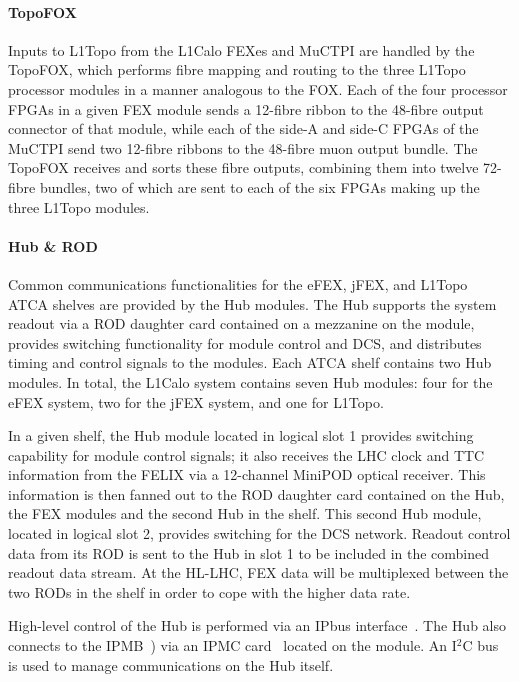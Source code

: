 \documentclass[cernpreprint, atlasdraft=false, UKenglish,british,orcidlogo, texmf, orcidlogo]{atlasdoc}
\begin{document}
\paragraph{TopoFOX} 
Inputs to \gls{L1Topo} from the \gls{L1Calo} FEXes and \gls{MuCTPI} are handled by the TopoFOX, which performs fibre mapping and routing to the three \gls{L1Topo} processor modules in a manner analogous to the \gls{FOX}.  Each of the four processor \glspl{FPGA} in a given \gls{FEX} module sends a 12-fibre ribbon to the 48-fibre output connector of that module, while each of the side-A and side-C \glspl{FPGA} of the \gls{MuCTPI} send two 12-fibre ribbons to the 48-fibre muon output bundle.  The TopoFOX receives and sorts these fibre outputs, combining them into twelve 72-fibre bundles, two of which are sent to each of the six \glspl{FPGA} making up the three \gls{L1Topo} modules.
 
\paragraph{Hub \& ROD}\label{sec:TDAQ_L1CaloHubROD}
Common communications functionalities for the \gls{eFEX}, \gls{jFEX}, and \gls{L1Topo} \gls{ATCA} shelves are provided by the \gls{Hub} modules.  The \gls{Hub} supports the system readout via a \gls{ROD} daughter card
contained on a mezzanine on the module, provides switching functionality for module control and \gls{DCS}, and distributes timing and control signals to the modules.  Each \gls{ATCA} shelf contains two \gls{Hub} modules.  In total, the \gls{L1Calo} system contains seven \gls{Hub} modules: four for the \gls{eFEX} system, two for the \gls{jFEX} system, and one for \gls{L1Topo}.
 
In a given shelf, the \gls{Hub} module located in logical slot 1 provides switching capability for module control signals; it also receives the \gls{LHC} clock and \gls{TTC} information from the \gls{FELIX} via a 12-channel MiniPOD optical receiver.  This information is then fanned out to the \gls{ROD} daughter card contained on the Hub, the \gls{FEX} modules and the second \gls{Hub} in the shelf.  This second \gls{Hub} module, located in logical slot 2, provides switching for the \gls{DCS} network.  Readout control data from its \gls{ROD} is sent to the \gls{Hub} in slot 1 to be included in the combined readout data stream.  At the \gls{HL-LHC}, \gls{FEX} data will be multiplexed between the two \glspl{ROD} in the shelf in order to cope with the higher data rate.
 
High-level control of the \gls{Hub} is performed via an IPbus interface~\cite{bib:IPbus}.  The \gls{Hub} also connects to the \gls{IPMB}~\cite{bib:IPMI}) via an \gls{IPMC} card~\cite{bib:CERN-IPMC} located on the module.  An I$^2$C bus is used to manage communications on the \gls{Hub} itself.
 
\end{document}
